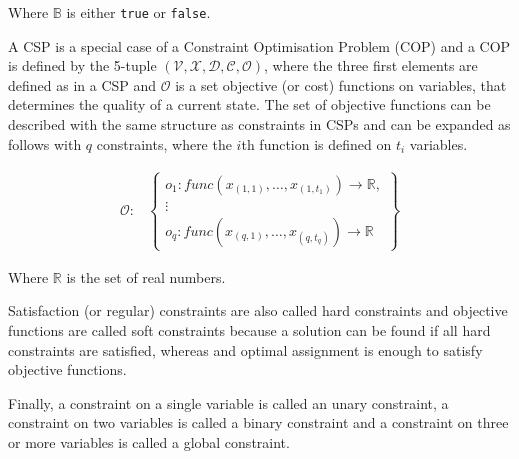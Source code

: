 Where $\mathbb{B}$ is either \texttt{true} or \texttt{false}.

A CSP is a special case of a Constraint Optimisation Problem (COP) and a COP is defined by the 5-tuple $(\mathcal{V}, \mathcal{X}, \mathcal{D}, \mathcal{C}, \mathcal{O})$, where the three first elements are defined as in a CSP and $\mathcal{O}$ is a set objective (or cost) functions on variables, that determines the quality of a current state. The set of objective functions can be described with the same structure as constraints in CSPs and can be expanded as follows with $q$ constraints, where the $i$th function is defined on $t_i$ variables.

\begin{align*}
	\mathcal{O}:&
	\begin{Bmatrix}
		o_1: func(x_{(1,1)}, \ldots,x_{(1,t_1)}) \rightarrow \mathbb{R},\\
		\vdots\\
		o_q: func(x_{(q,1)}, \ldots,x_{(q,t_q)}) \rightarrow \mathbb{R}
	\end{Bmatrix}
\end{align*}

Where $\mathbb{R}$ is the set of real numbers.

Satisfaction (or regular) constraints are also called hard constraints and objective functions are called soft constraints because a solution can be found if all hard constraints are satisfied, whereas and optimal assignment is enough to satisfy objective functions.

Finally, a constraint on a single variable is called an unary constraint, a constraint on two variables is called a binary constraint and a constraint on three or more variables is called a global constraint.


